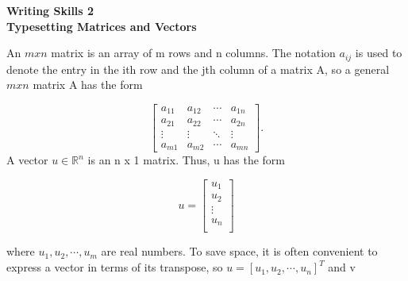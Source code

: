 \documentclass[12pt]{article}
\begin{document}
\begin{center}
\textbf{Writing Skills 2\\
Typesetting Matrices and Vectors}
\end{center}

An $m x n$ matrix is an array of m rows and n columns. The notation $a_{ij}$ 
is used to denote the entry in the ith row and the jth column of a matrix A,
so a general $m x n$ matrix A has the form 

    
       $$ \begin{bmatrix}
            a_{11} & a_{12} & \cdots & a_{1n} \\
            a_{21} & a_{22} & \cdots & a_{2n} \\
            \vdots  & \vdots  & \ddots & \vdots  \\
            a_{m1} & a_{m2} & \cdots & a_{mn} 
        \end{bmatrix}    .$$
A vector $u \in \mathbb{R}^n$ is an n x 1 matrix. Thus, u has the form

$$ u = \begin{bmatrix}
    u_1\\u_2\\\vdots\\u_n\\
\end{bmatrix}$$

where $u_1,u_2, \cdots , u_m$ are real numbers. To save space, it is often
convenient to express a vector in terms of its transpose, so $u = [u_1,u_2,\cdots,u_n]^T$ and v
\end{document}
